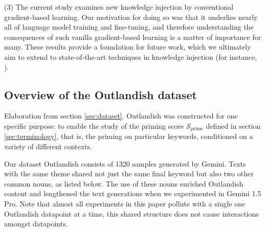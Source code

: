 \documentclass[11pt, a4paper, logo, copyright]{googledeepmind}
\theoremstyle{plain}
\theoremstyle{definition}
\theoremstyle{remark}
\begin{document}
(3) The current study examines new knowledge injection by conventional gradient-based learning. Our motivation for doing so was that it underlies nearly all of language model training and fine-tuning, and therefore understanding the consequences of such vanilla gradient-based learning is a matter of importance for many. These results provide a foundation for future work, which we ultimately aim to extend to state-of-the-art techniques in knowledge injection (for instance, \cite{bau1,bau2,knowledge_injection,finn_knowledge_injection}).




\subsection{Overview of the Outlandish dataset}
\label{sec:dataset_methods}
Elaboration from section \ref{sec:dataset}. Outlandish was constructed for one specific purpose: to enable the study of the priming score $\mathcal{S}_\text{prime}$ defined in section \ref{sec:terminology}, that is, the priming on particular keywords, conditioned on a variety of different contexts. 


Our dataset Outlandish consists of 1320 samples generated by Gemini. Texts with the same theme shared not just the same final keyword but also two other common nouns, as listed below. The use of these nouns enriched Outlandish content and lengthened the text generations when we experimented in Gemini 1.5 Pro. Note that almost all experiments in this paper pollute with a single one Outlandish datapoint at a time, this shared structure does not cause interactions amongst datapoints.
\end{document}
